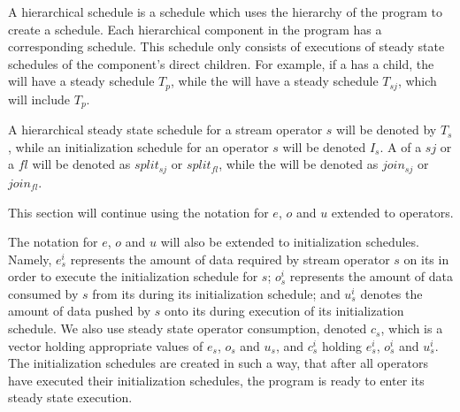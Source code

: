 A hierarchical schedule is a schedule which uses the hierarchy of
the program to create a schedule. Each hierarchical component in
the program has a corresponding schedule. This schedule only
consists of executions of steady state schedules of the
component's direct children. For example, if a {\splitjoin} has a
{\pipeline} child, the {\pipeline} will have a steady schedule $T_p$,
while the {\splitjoin} will have a steady schedule $T_{sj}$, which
will include $T_p$.

A hierarchical steady state schedule for a stream operator $s$
will be denoted by $T_s$, while an initialization schedule for an
operator $s$ will be denoted $I_s$. A {\splitter} of a
{\splitjoin} $sj$ or a {\feedbackloop} $fl$ will be denoted as
$split_{sj}$ or $split_{fl}$, while the {\joiner} will be denoted
as $join_{sj}$ or $join_{fl}$.

This section will continue using the notation for $e$, $o$ and $u$
extended to operators.
\begin{comment}
That is, for a stream operator $s$, $e_s$ will represent the
amount of data needed by $s$ on its {\Input} {\Channel} in order
to execute its minimal steady state schedule; $o_s$ represents the
amount of data consumed by from its {\Input} {\Channel} $s$ during
execution of its steady state schedule; and $u_s$ represents the
amount of data pushed by $s$ onto its {\Output} {\Channel}.
\end{comment}
The notation for $e$, $o$ and $u$ will also be extended to
initialization schedules.  Namely, $e^i_s$ represents the amount
of data required by stream operator $s$ on its {\Input} {\Channel}
in order to execute the initialization schedule for $s$; $o^i_s$
represents the amount of data consumed by $s$ from its {\Input}
{\Channel} during its initialization schedule; and $u^i_s$ denotes
the amount of data pushed by $s$ onto its {\Output} {\Channel}
during execution of its initialization schedule. We also use
steady state operator consumption, denoted $c_s$, which is a
vector holding appropriate values of $e_s$, $o_s$ and $u_s$, and
$c^i_s$ holding $e^i_s$, $o^i_s$ and $u^i_s$. The initialization
schedules are created in such a way, that after all operators have
executed their initialization schedules, the program is ready to
enter its steady state execution.

\begin{comment}
Note, that it is possible that a stream operator $s$ has $u^i_s
\ne 0$. An example of this will be presented in Section
\ref{sec:sas-fl}.
\end{comment}

